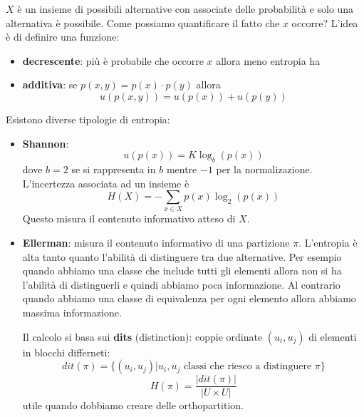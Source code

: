 $X$ è un insieme di possibili alternative con associate delle probabilità 
e solo una alternativa è possibile. Come possiamo quantificare il fatto che $x$ 
occorre? 
L'idea è di definire una funzione:
\begin{itemize}
    \item \textbf{decrescente}: più è probabile che 
    occorre $x$ allora meno entropia ha
    \item \textbf{additiva}: se $p(x,y) = p(x)\cdot p(y)$ allora 
    $$u(p(x,y)) = u(p(x)) + u(p(y))$$
\end{itemize}

Esistono diverse tipologie di entropia:
\begin{itemize}
    \item \textbf{Shannon}:  
    $$u(p(x)) = K\log_b(p(x))$$
    dove $b = 2$ se si rappresenta in $b$ mentre $-1$ per la normalizazione.
    L'incertezza associata ad un insieme è 
    $$H(X) = - \sum_{x\in X}p(x)\log_2(p(x))$$
    Questo misura il contenuto informativo atteso di $X$.

    \item \textbf{Ellerman}: misura il contenuto informativo di una partizione $\pi$.
    L'entropia è alta tanto quanto l'abilità di distinguere tra due alternative.
    Per esempio quando abbiamo una classe che include tutti gli elementi allora non 
    si ha l'abilità di distinguerli e quindi abbiamo poca informazione. Al contrario 
    quando abbiamo una classe di equivalenza per ogni elemento allora abbiamo 
    massima informazione.

    Il calcolo si basa sui \textbf{dits} (distinction): coppie ordinate $(u_i,u_j)$
    di elementi in blocchi differneti:
    $$dit(\pi) = \{(u_i,u_j)| u_i,u_j \text{ classi che riesco a distinguere }\pi\}$$
    $$H(\pi) = \frac{|dit(\pi)|}{|U\times U|}$$
    utile quando dobbiamo creare delle orthopartition.
\end{itemize}

